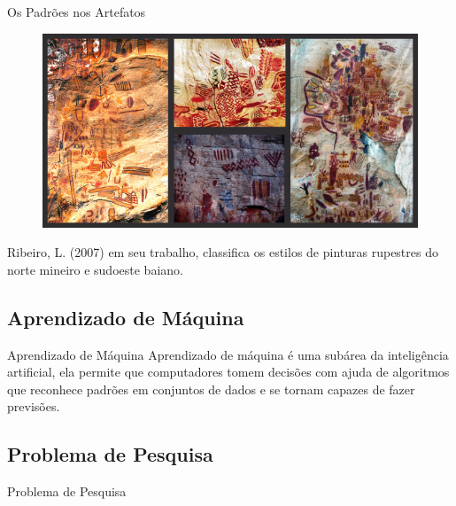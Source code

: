    \begin{frame}[fragile]{Os Padrões nos Artefatos}
        \begin{figure}[H]
        \begin{center}
            \includegraphics[scale=0.60]{images/arte_rupestre.png}
        \end{center}
        \end{figure}

        Ribeiro, L. (2007) em seu trabalho, classifica os estilos de pinturas 
        rupestres do norte mineiro e sudoeste baiano.
    \end{frame}

\subsection{Aprendizado de Máquina}
  \begin{frame}[fragile]{Aprendizado de Máquina}
  Aprendizado de máquina é uma subárea da inteligência artificial, ela permite
que computadores tomem decisões com ajuda de algoritmos que reconhece
padrões em conjuntos de dados e se tornam capazes de fazer previsões.
  \end{frame}

\subsection{Problema de Pesquisa}
  \begin{frame}[fragile]{Problema de Pesquisa}
  \end{frame}